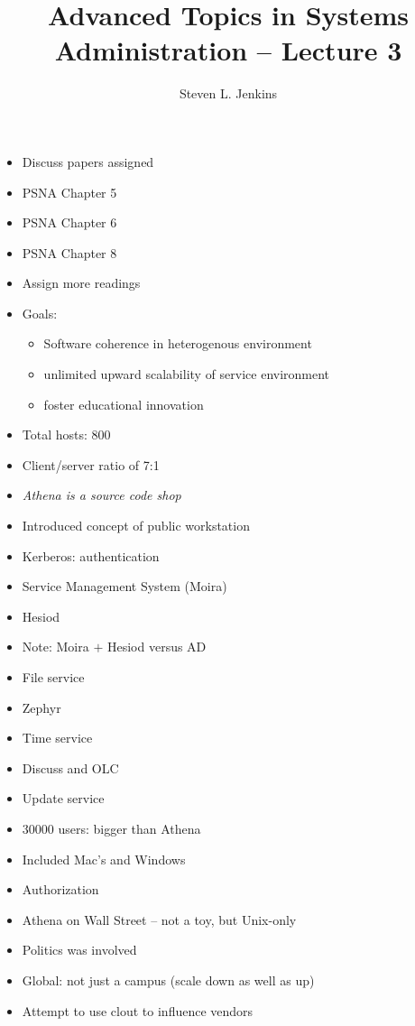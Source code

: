 \documentclass{slides}
\title{Advanced Topics in Systems Administration -- Lecture 3}
\author{Steven L. Jenkins}
\newcommand{\bi}{\begin{itemize}}
\newcommand{\ei}{\end{itemize}}
\begin{document}
\maketitle


\bi
\item Discuss papers assigned
\item PSNA Chapter 5
\item PSNA Chapter 6
\item PSNA Chapter 8
\item Assign more readings
\ei


\bi
\item Goals: 
	\bi
	\item Software coherence in heterogenous environment
	\item unlimited upward scalability of service environment
	\item foster educational innovation
	\ei
\item Total hosts: 800
\item Client/server ratio of 7:1
\item \emph{Athena is a source code shop}
\item Introduced concept of public workstation
\ei

\bi
\item Kerberos: authentication
\item Service Management System (Moira)
\item Hesiod
\item Note: Moira $+$ Hesiod versus AD
\item File service
\item Zephyr
\item Time service
\item Discuss and OLC
\item Update service
\ei


\bi
\item 30000 users: bigger than Athena
\item Included Mac's and Windows
\item Authorization
\ei

\bi
\item Athena on Wall Street -- not a toy, but Unix-only
\item Politics was involved
\item Global: not just a campus (scale down as well as up)
\item Attempt to use clout to influence vendors
\ei
\end{document}
